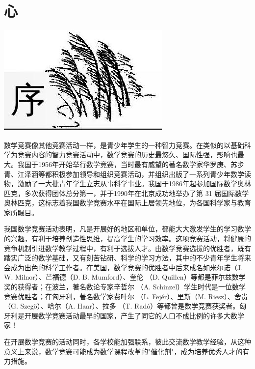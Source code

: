 \documentclass[10pt]{article}
\begin{document}
\section*{心}
\begin{center}
\includegraphics[max width=\textwidth]{2024_10_30_bd799899fef40368a068g-005}
\end{center}

数学竞赛像其他竞赛活动一样，是青少年学生的一种智力竞赛。在类似的以基础科学为竞赛内容的智力竞赛活动中，数学竞赛的历史最悠久、国际性强，影响也最大。我国于1956年开始举行数学竞赛，当时最有威望的著名数学家华罗庚、苏步青、江泽涵等都积极参加领导和组织竞赛活动，并组织出版了一系列青少年数学读物，激励了一大批青年学生立志从事科学事业。我国于1986年起参加国际数学奥林匹克，多次获得团体总分第一，并于1990年在北京成功地举办了第 31 届国际数学奥林匹克，这标志着我国数学竞赛水平在国际上居领先地位，为各国科学家与教育家所瞩目。

我国数学竞赛活动表明，凡是开展好的地区和单位，都能大大激发学生的学习数学的兴趣，有利于培养创造性思维，提高学生的学习效率。这项竞赛活动，将健康的竞争机制引进数学教学过程中，有利于选拔人才。由数学竞赛选拔的优胜者，既有踏实广泛的数学基础，又有刻苦钻研、科学的学习方法，其中的不少青年学生将来会成为出色的科学工作者。在美国，数学竞赛的优胜者中后来成名如米尔诺（J. W. Milnor）、芒福德（D. B. Mumford）、奎伦 （D. Quillen）等都是菲尔兹数学奖的获得者；在波兰，著名数论专家辛哲尔 （A. Schinzel）学生时代是一位数学竞赛优胜者；在匈牙利，著名数学家费叶尔 （L. Fejér）、里斯（M. Riesz）、舍贵（G. Szegö）、哈尔（A. Haar）、拉多 （T. Radó）等都曾是数学竞赛获奖者。匈牙利是开展数学竞赛活动最早的国家，产生了同它的人口不成比例的许多大数学家！

在开展数学竞赛的活动同时，各学校能加强联系，彼此交流数学教学经验，从这种意义上来说，数学竞赛可能成为数学课程改革的"催化剂"，成为培养优秀人才的有力措施。
\end{document}
